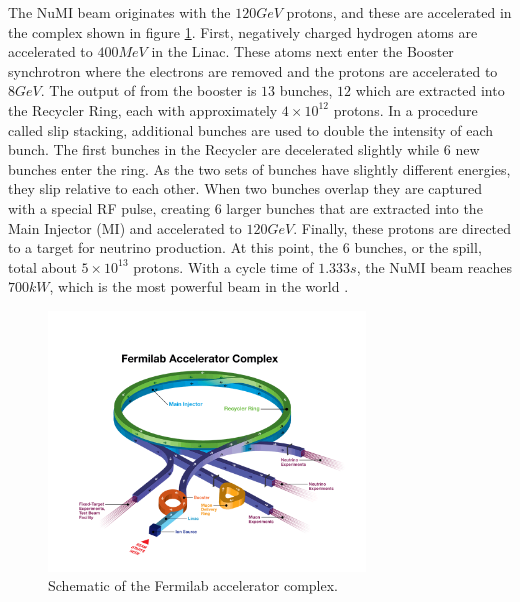 The NuMI beam originates with the $120\unit{GeV}$ protons, and these are accelerated in the complex shown in figure \ref{fig:FNAL_AC}. First, negatively charged hydrogen atoms are accelerated to $400\unit{MeV}$ in the Linac. These atoms next enter the Booster synchrotron where the electrons are removed and the protons are accelerated to $8\unit{GeV}$. The output of from the booster is $13$ bunches, $12$ which are extracted into the Recycler Ring, each with approximately $4\times10^{12}$ protons. In a procedure called slip stacking, additional bunches are used to double the intensity of each bunch. The first bunches in the Recycler are decelerated slightly while $6$ new bunches enter the ring. As the two sets of bunches have slightly different energies, they slip relative to each other. When two bunches overlap they are captured with a special RF pulse, creating $6$ larger bunches that are extracted into the Main Injector (MI) and accelerated to $120\unit{GeV}$. Finally, these protons are directed to a target for neutrino production. At this point, the $6$ bunches, or the spill, total about $5\times10^{13}$ protons. With a cycle time of $1.333\unit{s}$, the NuMI beam reaches $700\unit{kW}$, which is the most powerful beam in the world \cite{ref:TDRNOvA}.
\begin{figure}[htb]
  \centering
  \includegraphics[width=0.75\textwidth]{figures/FNAL_AC.png}
  \caption[Fermilab Accelerator Complex]{Schematic of the Fermilab accelerator complex.}
  \label{fig:FNAL_AC}
\end{figure}

